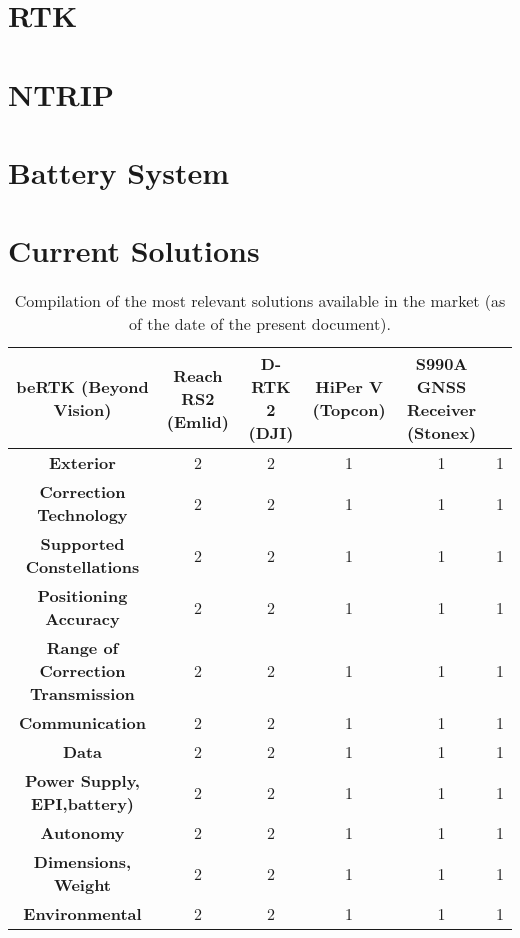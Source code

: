 \section{RTK}\label{II_rtk}

\section{NTRIP}\label{sec:II_ntrip}

\section{Battery System}\label{sec:II_battery}

\section{Current Solutions}\label{sec:II_curr_solutions}



\begin{table}[ht]       %
	\centering
    \captionsetup{justification=centering}
    \caption{Compilation of the most relevant solutions available in the market (as of the date of the present document).}
	\label{tab:current_solutions}
	\begin{tabular}{cccccc}
		\toprule
		\multicolumn{1}{c}{\textbf{beRTK (Beyond Vision)}} & \textbf{Reach RS2 (Emlid)} & \textbf{D-RTK 2 (DJI)} & \textbf{HiPer V (Topcon)} & \textbf{S990A GNSS Receiver (Stonex)}\\
		\midrule
		\textbf{Exterior} & 2 & 2 & 1 & 1 & 1 \\
		\textbf{Correction Technology} & 2 & 2 & 1 & 1 & 1 \\
        \textbf{Supported Constellations} & 2 & 2 & 1 & 1 & 1 \\
        \textbf{Positioning Accuracy} & 2 & 2 & 1 & 1 & 1 \\
        \textbf{Range of Correction Transmission} & 2 & 2 & 1 & 1 & 1 \\
        \textbf{Communication} & 2 & 2 & 1 & 1 & 1 \\
        \textbf{Data} & 2 & 2 & 1 & 1 & 1 \\
        \textbf{Power Supply, EPI,battery)} & 2 & 2 & 1 & 1 & 1 \\
        \textbf{Autonomy} & 2 & 2 & 1 & 1 & 1 \\
        \textbf{Dimensions, Weight} & 2 & 2 & 1 & 1 & 1 \\
        \textbf{Environmental} & 2 & 2 & 1 & 1 & 1 \\
		\bottomrule
	\end{tabular}
\end{table}
